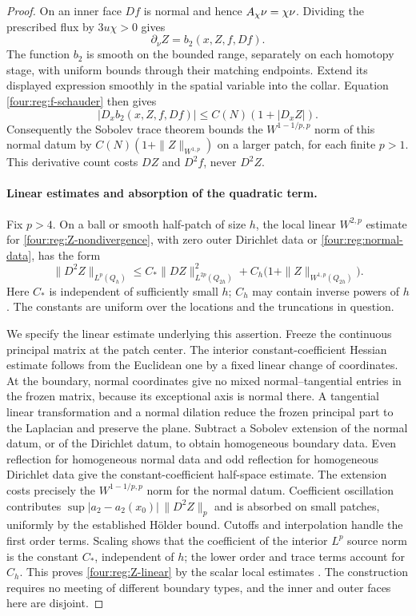 \begin{proof}
On an inner face $Df$ is normal and hence $A_\chi\nu=\chi\nu$.
Dividing the prescribed flux by $3u\chi>0$ gives
\begin{equation}\label{four:reg:normal-data}
 \partial_\nu Z=b_2(x,Z,f,Df).
\end{equation}
The function $b_2$ is smooth on the bounded range, separately on
each homotopy stage, with uniform bounds through their matching
endpoints.  Extend its displayed expression smoothly in the
spatial variable into the collar.  Equation
\eqref{four:reg:f-schauder} then gives
\[
 |D_xb_2(x,Z,f,Df)|\le C(N)(1+|D_xZ|).
\]
Consequently the Sobolev trace theorem bounds the
$W^{1-1/p,p}$ norm of this normal datum by
$C(N)(1+\|Z\|_{W^{1,p}})$ on a larger patch, for each finite
$p>1$.  This derivative count costs $DZ$ and $D^2f$, never $D^2Z$.

\paragraph{Linear estimates and absorption of the quadratic term.}
Fix $p>4$.  On a ball or smooth half-patch of size $h$, the local
linear $W^{2,p}$ estimate for \eqref{four:reg:Z-nondivergence}, with
zero outer Dirichlet data or \eqref{four:reg:normal-data}, has the form
\begin{equation}\label{four:reg:Z-linear}
 \|D^2Z\|_{L^p(Q_h)}
 \le C_*\|DZ\|_{L^{2p}(Q_{2h})}^2
          +C_h\bigl(1+\|Z\|_{W^{1,p}(Q_{2h})}\bigr).
\end{equation}
Here $C_*$ is independent of sufficiently small $h$; $C_h$ may
contain inverse powers of $h$.  The constants are uniform over
the locations and the truncations in question.

We specify the linear estimate underlying this assertion.  Freeze
the continuous principal matrix at the patch center.  The interior
constant-coefficient Hessian estimate follows from the Euclidean
one by a fixed linear change of coordinates.  At the boundary,
normal coordinates give no mixed normal--tangential entries in
the frozen matrix, because its exceptional axis is normal there.
A tangential linear transformation and a normal dilation reduce
the frozen principal part to the Laplacian and preserve the plane.
Subtract a Sobolev extension of the normal datum, or of the
Dirichlet datum, to obtain homogeneous boundary data.  Even
reflection for homogeneous normal data and odd reflection for
homogeneous Dirichlet data give the constant-coefficient half-space
estimate.  The extension costs precisely the
$W^{1-1/p,p}$ norm for the normal datum.  Coefficient oscillation
contributes $\sup|a_2-a_2(x_0)|\,\|D^2Z\|_p$ and is absorbed on
small patches, uniformly by the established H\"older bound.
Cutoffs and interpolation handle the first order terms.  Scaling
shows that the coefficient of the interior $L^p$ source norm is
the constant $C_*$, independent of $h$; the lower order and trace
terms account for $C_h$.  This proves
\eqref{four:reg:Z-linear} by the scalar local estimates
\cite{GilbargTrudinger2001}.  The construction requires no meeting of different
boundary types, and the inner and outer faces here are disjoint.


\end{proof}
